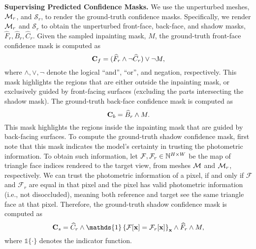 \noindent\textbf{Supervising Predicted Confidence Masks.}
We use the unperturbed meshes, $\mathcal{M}_r$, and $\mathcal{S}_r$, to render the ground-truth confidence masks. Specifically, we render $\mathcal{M}_r$ and $\mathcal{S}_r$ to obtain the unperturbed front-face, back-face, and shadow masks, $\widehat{F}_r, \widehat{B}_r, \widehat{C}_r$. Given the sampled inpainting mask, $M$, the ground-truth front-face confidence mask is computed as
\begin{equation}
\mathbf{C}_f = (\widehat{F}_r \land \neg \widehat{C}_r) \lor \neg M,
\end{equation}
where $\land, \lor, \neg$ denote the logical ``and'', ``or'', and negation, respectively. This mask highlights the regions that are either outside the inpainting mask, or exclusively guided by front-facing surfaces (excluding the parts intersecting the shadow mask). The ground-truth back-face confidence mask is computed as
\begin{equation}
\mathbf{C}_b = \widehat{B}_r \land M.
\end{equation}
This mask highlights the regions inside the inpainting mask that are guided by back-facing surfaces.
To compute the ground-truth shadow confidence mask, first note that this mask indicates the model's certainty in trusting the photometric information. To obtain such information, let $\mathcal{F}, \mathcal{F}_r \in \mathbb{N}^{H \times W}$ be the map of triangle face indices rendered to the target view, from meshes $\mathcal{M}$ and $\mathcal{M}_r$, respectively. We can trust the photometric information of a pixel, if and only if $\mathcal{F}$ and $\mathcal{F}_r$ are equal in that pixel and the pixel has valid photometric information (i.e., not disoccluded), meaning both reference and target see the same triangle face at that pixel. Therefore, the ground-truth shadow confidence mask is computed as
\begin{equation}
\CB_s = \widehat{C}_r \land \mathds{1}\left\{\mathcal{F}[\xB] = \mathcal{F}_r[\xB]\right\}_\xB \land \widehat{F}_r \land M,
\end{equation}
where $\mathds{1}\{\cdot\}$ denotes the indicator function.

